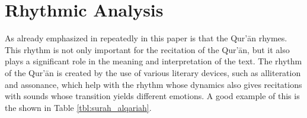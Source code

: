 
\section{Rhythmic Analysis}\label{sec:result_rhythmic_analysis}
As already emphasized in repeatedly in this paper is that the Qur'\=an rhymes. This rhythm is not only important for the recitation of the Qur'\=an, but it also plays a significant role in the meaning and interpretation of the text. The rhythm of the Qur'\=an is created by the use of various literary devices, such as alliteration and assonance, which help with the rhythm whose dynamics also gives recitations with sounds whose transition yields different emotions. A good example of this is the   shown in Table \ref{tbl:surah_alqariah}.

